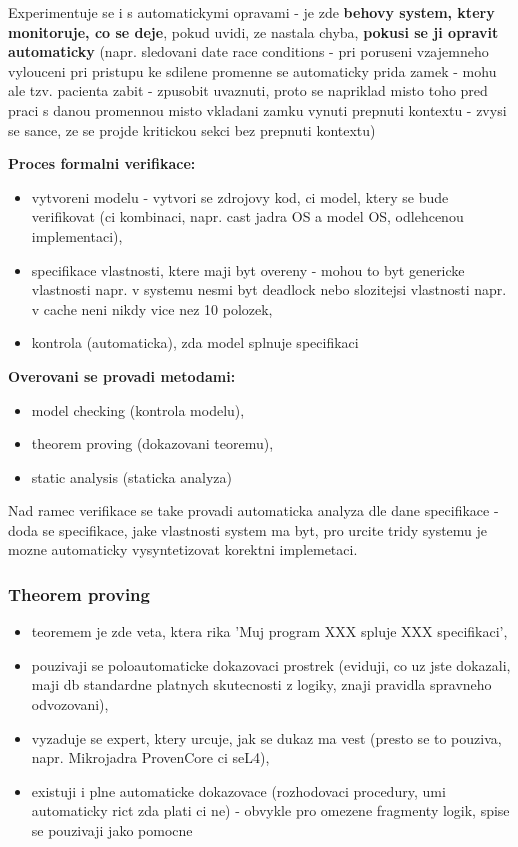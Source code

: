 \documentclass[a4paper, 11pt]{article}
\begin{document}
Experimentuje se i s automatickymi opravami - je zde \textbf{behovy system, ktery monitoruje, co se deje}, pokud uvidi, ze nastala chyba, \textbf{pokusi se ji opravit automaticky} (napr. sledovani date race conditions - pri poruseni vzajemneho vylouceni pri pristupu ke sdilene promenne se automaticky prida zamek - mohu ale tzv. pacienta zabit - zpusobit uvaznuti, proto se napriklad misto toho pred praci s danou promennou misto vkladani zamku vynuti prepnuti kontextu - zvysi se sance, ze se projde kritickou sekci bez prepnuti kontextu)

\textbf{Proces formalni verifikace:}
\begin{itemize}
    \item vytvoreni modelu - vytvori se zdrojovy kod, ci model, ktery se bude verifikovat (ci kombinaci, napr. cast jadra OS a model OS, odlehcenou implementaci),
    \item specifikace vlastnosti, ktere maji byt overeny - mohou to byt genericke vlastnosti napr. v systemu nesmi byt deadlock nebo slozitejsi vlastnosti napr. v cache neni nikdy vice nez 10 polozek,
    \item kontrola (automaticka), zda model splnuje specifikaci \\
\end{itemize}

\textbf{Overovani se provadi metodami:}
\begin{itemize}
    \item model checking (kontrola modelu),
    \item theorem proving (dokazovani teoremu),
    \item static analysis (staticka analyza) \\
\end{itemize}

Nad ramec verifikace se take provadi automaticka analyza dle dane specifikace - doda se specifikace, jake vlastnosti system ma byt, pro urcite tridy systemu je mozne automaticky vysyntetizovat korektni implemetaci.

\newpage

\subsubsection{Theorem proving}
\begin{itemize}
    \item teoremem je zde veta, ktera rika 'Muj program XXX spluje XXX specifikaci',
    \item pouzivaji se poloautomaticke dokazovaci prostrek (eviduji, co uz jste dokazali, maji db standardne platnych skutecnosti z logiky, znaji pravidla spravneho odvozovani),
    \item vyzaduje se expert, ktery urcuje, jak se dukaz ma vest (presto se to pouziva, napr. Mikrojadra ProvenCore ci seL4),
    \item existuji i plne automaticke dokazovace (rozhodovaci procedury, umi automaticky rict zda plati ci ne) - obvykle pro omezene fragmenty logik, spise se pouzivaji jako pomocne \\
\end{itemize}
\end{document}
